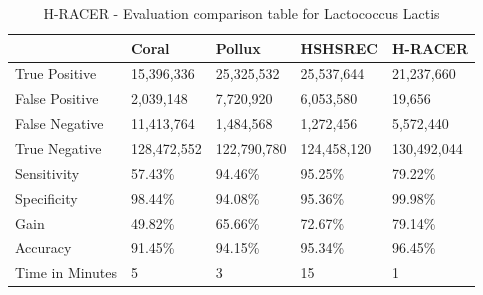 \documentclass[12pt,openany]{llncs}
\begin{document}
\begingroup
\renewcommand\arraystretch{2.5}
\begin{longtable}{|m{33mm}|m{20mm}|m{20mm}|m{20mm}|m{20mm}|}
	    \caption{\label{tab:eval-1}H-RACER - Evaluation comparison table for Lactococcus Lactis}\\
        \hline
           & Coral & Pollux & HSHSREC & H-RACER\cellcolor{DarkGray} \\ %
        \hline
           True Positive & 15,396,336 &  25,325,532 & 25,537,644 & 21,237,660\cellcolor{LightGray} \\ %
        \hline
           False Positive & 2,039,148 &  7,720,920 & 6,053,580 & 19,656\cellcolor{LightGray} \\ %
        \hline
           False Negative & 11,413,764 & 1,484,568 & 1,272,456 & 5,572,440\cellcolor{LightGray} \\ %
        \hline
           True Negative & 128,472,552 & 122,790,780 & 124,458,120 & 130,492,044\cellcolor{LightGray} \\ %
        \hline
           Sensitivity & 57.43\% & 94.46\% & 95.25\% & 79.22\%\cellcolor{LightGray} \\ %
        \hline
           Specificity & 98.44\% & 94.08\% & 95.36\% & 99.98\%\cellcolor{LightGray} \\ %
        \hline
           Gain & 49.82\% & 65.66\% & 72.67\% & 79.14\%\cellcolor{LightGray} \\ %
        \hline
           Accuracy & 91.45\% & 94.15\% & 95.34\% & 96.45\%\cellcolor{LightGray} \\ %
        \hline
           Time in Minutes& 5 & 3 & 15 & 1\cellcolor{LightGray} \\ %
        \hline
\end{longtable}
\endgroup

\newpage
\end{document}
